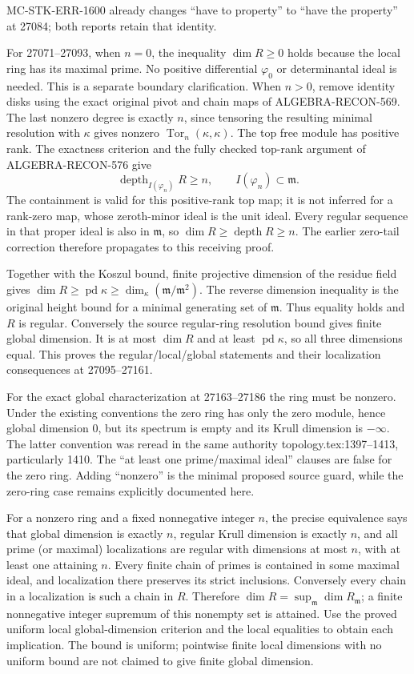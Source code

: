 MC-STK-ERR-1600 already changes ``have to property'' to ``have the property'' at 27084; both reports retain that identity.

For 27071--27093, when \(n=0\), the inequality \(\dim R\ge0\) holds because the local ring has its maximal prime. No positive differential \(\varphi_0\) or determinantal ideal is needed. This is a separate boundary clarification. When \(n>0\), remove identity disks using the exact original pivot and chain maps of ALGEBRA-RECON-569. The last nonzero degree is exactly \(n\), since tensoring the resulting minimal resolution with \(\kappa\) gives nonzero \(\operatorname{Tor}_n(\kappa,\kappa)\). The top free module has positive rank. The exactness criterion and the fully checked top-rank argument of ALGEBRA-RECON-576 give \[
\operatorname{depth}_{I(\varphi_n)}R\ge n,\qquad
I(\varphi_n)\subset\mathfrak m .
\] The containment is valid for this positive-rank top map; it is not inferred for a rank-zero map, whose zeroth-minor ideal is the unit ideal. Every regular sequence in that proper ideal is also in \(\mathfrak m\), so \(\dim R\ge\operatorname{depth}R\ge n\). The earlier zero-tail correction therefore propagates to this receiving proof.

Together with the Koszul bound, finite projective dimension of the residue field gives \(\dim R\ge\operatorname{pd}\kappa\ge\dim_\kappa(\mathfrak m/\mathfrak m^2)\). The reverse dimension inequality is the original height bound for a minimal generating set of \(\mathfrak m\). Thus equality holds and \(R\) is regular. Conversely the source regular-ring resolution bound gives finite global dimension. It is at most \(\dim R\) and at least \(\operatorname{pd}\kappa\), so all three dimensions equal. This proves the regular/local/global statements and their localization consequences at 27095--27161.

For the exact global characterization at 27163--27186 the ring must be nonzero. Under the existing conventions the zero ring has only the zero module, hence global dimension 0, but its spectrum is empty and its Krull dimension is \(-\infty\). The latter convention was reread in the same authority topology.tex:1397--1413, particularly 1410. The ``at least one prime/maximal ideal'' clauses are false for the zero ring. Adding ``nonzero'' is the minimal proposed source guard, while the zero-ring case remains explicitly documented here.

For a nonzero ring and a fixed nonnegative integer \(n\), the precise equivalence says that global dimension is exactly \(n\), regular Krull dimension is exactly \(n\), and all prime (or maximal) localizations are regular with dimensions at most \(n\), with at least one attaining \(n\). Every finite chain of primes is contained in some maximal ideal, and localization there preserves its strict inclusions. Conversely every chain in a localization is such a chain in \(R\). Therefore \(\dim R=\sup_{\mathfrak m}\dim R_{\mathfrak m}\); a finite nonnegative integer supremum of this nonempty set is attained. Use the proved uniform local global-dimension criterion and the local equalities to obtain each implication. The bound is uniform; pointwise finite local dimensions with no uniform bound are not claimed to give finite global dimension.

